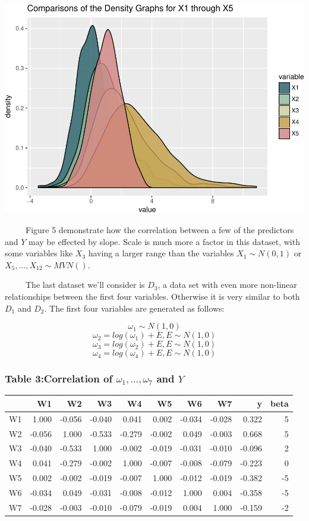 \documentclass[12pt,twoside]{reedthesis}
\begin{document}
  \begin{center}\includegraphics{Thesis_files/figure-latex/fig5-1} \end{center}
  
  ~~~~~Figure 5 demonstrate how the correlation between a few of the
  predictors and \(Y\) may be effected by slope. Scale is much more a
  factor in this dataset, with some variables like \(X_3\) having a larger
  range than the variables \(X_1 \sim N(0,1)\) or
  \(X_5,...,X_{12} \sim MVN()\).
  
  ~~~~~The last dataset we'll consider is \(D_3\), a data set with even
  more non-linear relationships between the first four variables.
  Otherwise it is very similar to both \(D_1\) and \(D_2\). The first four
  variables are generated as follows:
  
  \[\omega_1 \sim N(1,0)\] \[\omega_2 = log(\omega_1) + E, E \sim N(1,0)\]
  \[\omega_3 = log(\omega_2) + E, E \sim N(1,0)\]
  \[\omega_4 = log(\omega_4) + E, E \sim N(1,0)\]
  
  \subsubsection{\texorpdfstring{Table 3:Correlation of
  \(\omega_1,..., \omega_7\) and
  \(Y\)}{Table 3:Correlation of \textbackslash{}omega\_1,..., \textbackslash{}omega\_7 and Y}}\label{table-3correlation-of-omega_1...-omega_7-and-y}
  
  \begin{longtable}[]{@{}lrrrrrrrrr@{}}
  \toprule
  & W1 & W2 & W3 & W4 & W5 & W6 & W7 & y & beta\tabularnewline
  \midrule
  \endhead
  W1 & 1.000 & -0.056 & -0.040 & 0.041 & 0.002 & -0.034 & -0.028 & 0.322 &
  5\tabularnewline
  W2 & -0.056 & 1.000 & -0.533 & -0.279 & -0.002 & 0.049 & -0.003 & 0.668
  & 5\tabularnewline
  W3 & -0.040 & -0.533 & 1.000 & -0.002 & -0.019 & -0.031 & -0.010 &
  -0.096 & 2\tabularnewline
  W4 & 0.041 & -0.279 & -0.002 & 1.000 & -0.007 & -0.008 & -0.079 & -0.223
  & 0\tabularnewline
  W5 & 0.002 & -0.002 & -0.019 & -0.007 & 1.000 & -0.012 & -0.019 & -0.382
  & -5\tabularnewline
  W6 & -0.034 & 0.049 & -0.031 & -0.008 & -0.012 & 1.000 & 0.004 & -0.358
  & -5\tabularnewline
  W7 & -0.028 & -0.003 & -0.010 & -0.079 & -0.019 & 0.004 & 1.000 & -0.159
  & -2\tabularnewline
  \bottomrule
  \end{longtable}
  
\end{document}
